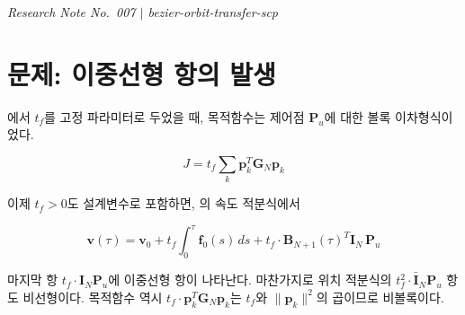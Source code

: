 \documentclass[11pt]{article}
\begin{document}
\drawborder
\thispagestyle{firstpage}


{\normalsize\textit{Research Note No.~007 $|$ bezier-orbit-transfer-scp}}\par\medskip

\def\lighterdate{March 12, 2026}


\begin{abstract}
비행시간 $t_f$를 설계변수로 포함하면 목적함수와 동역학 제약조건에
$t_f \cdot \mathbf{P}_u$ 형태의 이중선형(bilinear) 항이 나타나 볼록성이 깨진다.
본 보고서는 보조변수 승강(auxiliary variable lifting) 기법을 이용하여
이중선형 항을 새로운 변수 $\mathbf{Z} = t_f \mathbf{P}_u$로 치환함으로써
볼록 정식화를 유지하는 방법을 유도한다.
$t_f$는 외부 루프(outer loop)에서 업데이트하며,
내부 루프(inner loop)에서는 $\mathbf{Z}$에 대한 QP/SOCP를 반복하여 푼다.
\end{abstract}

\section{문제: 이중선형 항의 발생}

\cite{report006}에서 $t_f$를 고정 파라미터로 두었을 때,
목적함수는 제어점 $\mathbf{P}_u$에 대한 볼록 이차형식이었다.

\begin{equation}
  J = t_f \sum_{k} \mathbf{p}_k^T \mathbf{G}_N \mathbf{p}_k
  \label{eq:cost_fixed_tf}
\end{equation}

이제 $t_f > 0$도 설계변수로 포함하면, \cite{report004}의 속도 적분식에서

\begin{equation}
  \mathbf{v}(\tau) = \mathbf{v}_0
  + t_f \int_0^\tau \mathbf{f}_0(s)\,ds
  + t_f \cdot \mathbf{B}_{N+1}(\tau)^T \mathbf{I}_N\, \mathbf{P}_u
  \label{eq:vel_bilinear}
\end{equation}

마지막 항 $t_f \cdot \mathbf{I}_N \mathbf{P}_u$에 이중선형 항이 나타난다.
마찬가지로 위치 적분식의 $t_f^2 \cdot \bar{\mathbf{I}}_N \mathbf{P}_u$ 항도 비선형이다.
목적함수 역시 $t_f \cdot \mathbf{p}_k^T \mathbf{G}_N \mathbf{p}_k$는
$t_f$와 $\|\mathbf{p}_k\|^2$의 곱이므로 비볼록이다.
\end{document}
